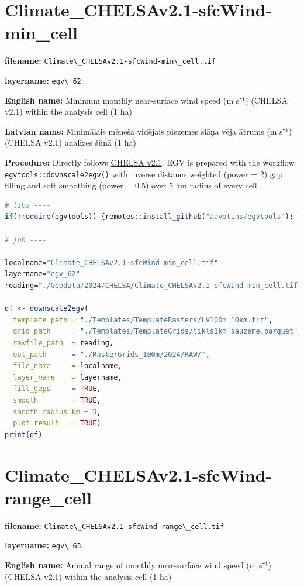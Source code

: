 \documentclass[
]{book}
\newcommand{\passthrough}[1]{#1}
\begin{document}
\section{Climate\_CHELSAv2.1-sfcWind-min\_cell}\label{ch06.062}

\textbf{filename:} \passthrough{\lstinline!Climate\_CHELSAv2.1-sfcWind-min\_cell.tif!}

\textbf{layername:} \passthrough{\lstinline!egv\_62!}

\textbf{English name:} Minimum monthly near-surface wind speed (m s⁻¹) (CHELSA v2.1) within the analysis cell (1 ha)

\textbf{Latvian name:} Minimālais mēneša vidējais piezemes slāņa vēja ātrums (m s⁻¹) (CHELSA v2.1) analīzes šūnā (1 ha)

\textbf{Procedure:} Directly follows \hyperref[Ch04.11]{CHELSA v2.1}. EGV is prepared with the
workflow \passthrough{\lstinline!egvtools::downscale2egv()!} with inverse distance weighted (power = 2)
gap filling and soft smoothing (power = 0.5) over 5 km radius of every cell.

\begin{lstlisting}[language=R]
# libs ----
if(!require(egvtools)) {remotes::install_github("aavotins/egvtools"); require(egvtools)}

# job ----

localname="Climate_CHELSAv2.1-sfcWind-min_cell.tif"
layername="egv_62"
reading="./Geodata/2024/CHELSA/Climate_CHELSAv2.1-sfcWind-min_cell.tif"

df <- downscale2egv(
  template_path = "./Templates/TemplateRasters/LV100m_10km.tif",
  grid_path     = "./Templates/TemplateGrids/tikls1km_sauzeme.parquet",
  rawfile_path  = reading,
  out_path      = "./RasterGrids_100m/2024/RAW/",
  file_name     = localname,
  layer_name    = layername,
  fill_gaps     = TRUE,
  smooth        = TRUE,
  smooth_radius_km = 5,
  plot_result   = TRUE)
print(df)
\end{lstlisting}

\section{Climate\_CHELSAv2.1-sfcWind-range\_cell}\label{ch06.063}

\textbf{filename:} \passthrough{\lstinline!Climate\_CHELSAv2.1-sfcWind-range\_cell.tif!}

\textbf{layername:} \passthrough{\lstinline!egv\_63!}

\textbf{English name:} Annual range of monthly near-surface wind speed (m s⁻¹) (CHELSA v2.1) within the analysis cell (1 ha)
\end{document}
